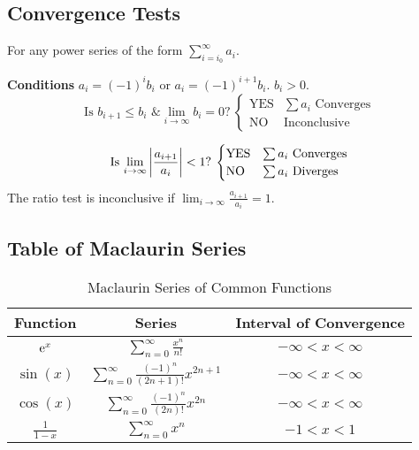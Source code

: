 \documentclass{article}
\begin{document}
\subsection{Convergence Tests}
For any power series of the form $\displaystyle\sum_{i=i_0}^\infty a_i$.
\begin{mdframed}[style=exampledefaultcols,frametitle={Alternating Series}]
    \textbf{Conditions} $a_i = \left( -1 \right)^i b_i$ or
    $a_i = \left( -1 \right)^{i+1} b_i$. $b_i>0$.
    \begin{equation*}
        \text{Is $b_{i+1}\leqslant b_i$ \& $\lim_{i\to\infty}b_i=0$?}\:
        \begin{cases}
            \text{YES} & \text{$\sum a_i$ Converges} \\
            \text{NO} & \text{Inconclusive}
        \end{cases}
    \end{equation*}
\end{mdframed}
\begin{mdframed}[style=exampledefaultcols,frametitle={Ratio Test}]
    \begin{equation*}
        \text{Is $\lim_{i\to\infty}\abs{\frac{a_{i+1}}{a_i}} < 1$?}\:
        \begin{cases}
            \text{YES} & \text{$\sum a_i$ Converges} \\
            \text{NO} & \text{$\sum a_i$ Diverges}
        \end{cases}
    \end{equation*}
    The ratio test is inconclusive if
    $\displaystyle \lim_{i\to\infty}\frac{a_{i+1}}{a_i} = 1$.
\end{mdframed}
\subsection{Table of Maclaurin Series}
\begin{table}[H]
    \centering
    \begin{tabular}{c | c | c}
        \toprule
        \textbf{Function} & \textbf{Series} & \textbf{Interval of Convergence} \\
        \midrule
        $\mathrm{e}^{x}$ & $\displaystyle \sum_{n=0}^{\infty} \frac{x^n}{n!}$ & $-\infty < x < \infty$ \\[14pt]
        $\sin{\left( x \right)}$ & $\displaystyle \sum_{n=0}^{\infty} \frac{\left( -1 \right)^n}{\left( 2n+1 \right)!} x^{2n+1}$ & $-\infty < x < \infty$ \\[14pt]
        $\cos{\left( x \right)}$ & $\displaystyle \sum_{n=0}^{\infty} \frac{\left( -1 \right)^n}{\left( 2n \right)!} x^{2n}$ & $-\infty < x < \infty$ \\[14pt]
        $\frac{1}{1-x}$ & $\displaystyle \sum_{n=0}^{\infty} x^n$ & $-1 < x < 1$ \\
        \bottomrule
    \end{tabular}
    \caption{Maclaurin Series of Common Functions}
\end{table}
\newpage
\end{document}
